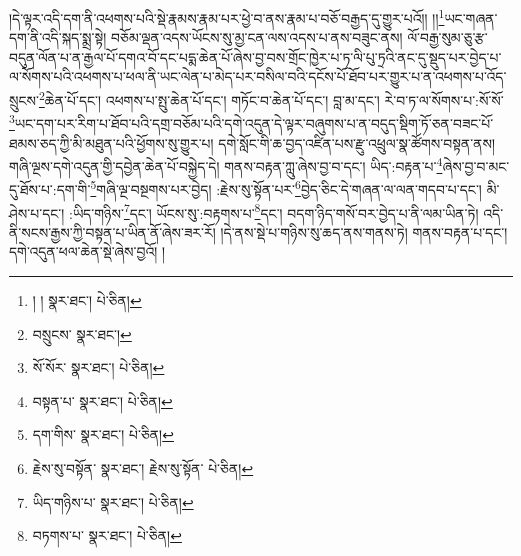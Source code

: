 །དེ་ལྟར་འདི་དག་ནི་འཕགས་པའི་སྡེ་རྣམས་རྣམ་པར་ཕྱེ་བ་ནས་རྣམ་པ་བཅོ་བརྒྱད་དུ་གྱུར་པའོ།། །།\footnote{། །  སྣར་ཐང་།  པེ་ཅིན། }ཡང་གཞན་དག་ནི་འདི་སྐད་སྨྲ་སྟེ། བཅོམ་ལྡན་འདས་ཡོངས་སུ་མྱ་ངན་ལས་འདས་པ་ནས་བཟུང་ནས། ལོ་བརྒྱ་སུམ་ཅུ་རྩ་བདུན་ལོན་པ་ན་རྒྱལ་པོ་དགའ་བོ་དང་པདྨ་ཆེན་པོ་ཞེས་བྱ་བས་གྲོང་ཁྱེར་པ་ཏ་ལི་པུ་ཏྲའི་ནང་དུ་སྡུད་པར་བྱེད་པ་ལ་སོགས་པའི་འཕགས་པ་ཕལ་ནི་ཡང་ལེན་པ་མེད་པར་བསིལ་བའི་དངོས་པོ་ཐོབ་པར་གྱུར་པ་ན་འཕགས་པ་འོད་སྲུངས་\footnote{བསྲུངས་  སྣར་ཐང་། }ཆེན་པོ་དང་། འཕགས་པ་སྤུ་ཆེན་པོ་དང་། གཏོང་བ་ཆེན་པོ་དང་། བླ་མ་དང་། རེ་བ་ཏ་ལ་སོགས་པ་:སོ་སོ་\footnote{སོ་སོར་  སྣར་ཐང་།  པེ་ཅིན། }ཡང་དག་པར་རིག་པ་ཐོབ་པའི་དགྲ་བཅོམ་པའི་དགེ་འདུན་དེ་ལྟར་བཞུགས་པ་ན་བདུད་སྡིག་ཏོ་ཅན་བཟང་པོ་ཐམས་ཅད་ཀྱི་མི་མཐུན་པའི་ཕྱོགས་སུ་གྱུར་པ། དགེ་སློང་གི་ཆ་བྱད་འཛིན་པས་རྫུ་འཕྲུལ་སྣ་ཚོགས་བསྟན་ནས། གཞི་ལྔས་དགེ་འདུན་གྱི་དབྱེན་ཆེན་པོ་བསྐྱེད་དེ། གནས་བརྟན་ཀླུ་ཞེས་བྱ་བ་དང་། ཡིད་:བརྟན་པ་\footnote{བསྟན་པ་  སྣར་ཐང་།  པེ་ཅིན། }ཞེས་བྱ་བ་མང་དུ་ཐོས་པ་:དག་གི་\footnote{དག་གིས་  སྣར་ཐང་།  པེ་ཅིན། }གཞི་ལྔ་བསྔགས་པར་བྱེད། :རྗེས་སུ་སྟོན་པར་\footnote{རྗེས་སུ་བསྟོན་  སྣར་ཐང་། རྗེས་སུ་སྟོན་  པེ་ཅིན། }བྱེད་ཅིང་དེ་གཞན་ལ་ལན་གདབ་པ་དང་། མི་ཤེས་པ་དང་། :ཡིད་གཉིས་\footnote{ཡིད་གཉིས་པ་  སྣར་ཐང་།  པེ་ཅིན། }དང་། ཡོངས་སུ་:བརྟགས་པ་\footnote{བཏགས་པ་  སྣར་ཐང་།  པེ་ཅིན། }དང་། བདག་ཉིད་གསོ་བར་བྱེད་པ་ནི་ལམ་ཡིན་ཏེ། འདི་ནི་སངས་རྒྱས་ཀྱི་བསྟན་པ་ཡིན་ནོ་ཞེས་ཟར་རོ། །དེ་ནས་སྡེ་པ་གཉིས་སུ་ཆད་ནས་གནས་ཏེ། གནས་བརྟན་པ་དང་། དགེ་འདུན་ཕལ་ཆེན་སྡེ་ཞེས་བྱའོ། །
